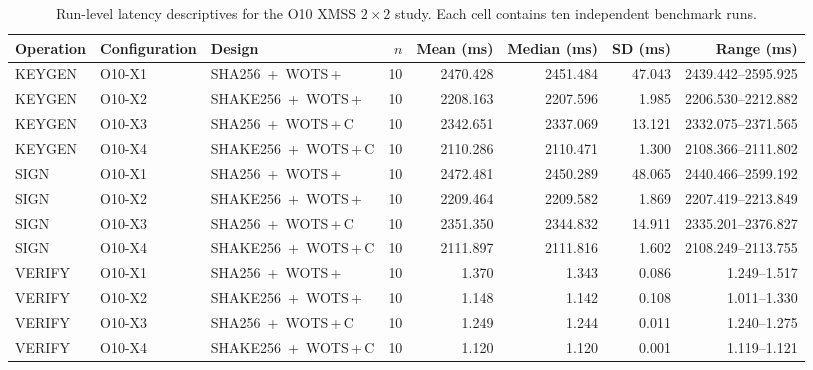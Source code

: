 \begin{table}[t]
\centering
\caption{Run-level latency descriptives for the O10 XMSS $2\times2$ study. Each cell contains ten independent benchmark runs.}
\label{tab:o10_cell_latency}
\footnotesize
\begin{tabular}{lllrrrrr}
\toprule
Operation & Configuration & Design & $n$ & Mean (ms) & Median (ms) & SD (ms) & Range (ms)\\
\midrule
KEYGEN & O10-X1 & SHA256 \,+\, WOTS\,+\, & 10 & 2470.428 & 2451.484 & 47.043 & 2439.442--2595.925 \\
KEYGEN & O10-X2 & SHAKE256 \,+\, WOTS\,+\, & 10 & 2208.163 & 2207.596 & 1.985 & 2206.530--2212.882 \\
KEYGEN & O10-X3 & SHA256 \,+\, WOTS\,+\,C & 10 & 2342.651 & 2337.069 & 13.121 & 2332.075--2371.565 \\
KEYGEN & O10-X4 & SHAKE256 \,+\, WOTS\,+\,C & 10 & 2110.286 & 2110.471 & 1.300 & 2108.366--2111.802 \\
SIGN & O10-X1 & SHA256 \,+\, WOTS\,+\, & 10 & 2472.481 & 2450.289 & 48.065 & 2440.466--2599.192 \\
SIGN & O10-X2 & SHAKE256 \,+\, WOTS\,+\, & 10 & 2209.464 & 2209.582 & 1.869 & 2207.419--2213.849 \\
SIGN & O10-X3 & SHA256 \,+\, WOTS\,+\,C & 10 & 2351.350 & 2344.832 & 14.911 & 2335.201--2376.827 \\
SIGN & O10-X4 & SHAKE256 \,+\, WOTS\,+\,C & 10 & 2111.897 & 2111.816 & 1.602 & 2108.249--2113.755 \\
VERIFY & O10-X1 & SHA256 \,+\, WOTS\,+\, & 10 & 1.370 & 1.343 & 0.086 & 1.249--1.517 \\
VERIFY & O10-X2 & SHAKE256 \,+\, WOTS\,+\, & 10 & 1.148 & 1.142 & 0.108 & 1.011--1.330 \\
VERIFY & O10-X3 & SHA256 \,+\, WOTS\,+\,C & 10 & 1.249 & 1.244 & 0.011 & 1.240--1.275 \\
VERIFY & O10-X4 & SHAKE256 \,+\, WOTS\,+\,C & 10 & 1.120 & 1.120 & 0.001 & 1.119--1.121 \\
\bottomrule
\end{tabular}
\end{table}

